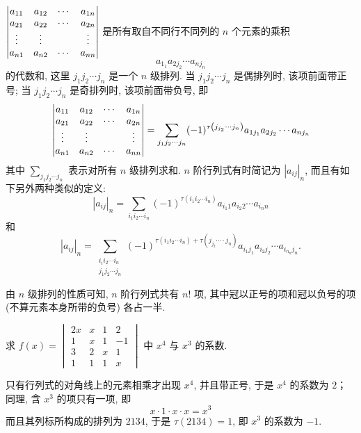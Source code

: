 \begin{definition}[$n$ 阶行列式]
    $\mqty|a_{11} & a_{12} & \cdots & a_{1 n} \\ a_{21} & a_{22} & \cdots & a_{2 n} \\ \vdots & \vdots & & \vdots \\ a_{n 1} & a_{n 2} & \cdots & a_{n n}|$
    是所有取自不同行不同列的 $ n $ 个元素的乘积 $$ a_{1_{1}} a_{2 j_{2}} \cdots a_{n j_{n}} $$ 的代数和, 这里 $ j_{1} j_{2} \cdots j_{n} $ 是一个 $ n $ 级排列.
    当 $ j_{1} j_{2} \cdots j_{n} $ 是偶排列时, 该项前面带正号; 当 $ j_{1} j_{2} \cdots j_{n} $ 是奇排列时, 该项前面带负号, 即
    $$\mqty|a_{11}  & a_{12}  & \cdots & a_{1 n} \\
            a_{21}  & a_{22}  & \cdots & a_{2 n} \\
            \vdots  & \vdots  &        & \vdots  \\
            a_{n 1} & a_{n 2} & \cdots & a_{n n}|=\sum_{j_{1} j_{2} \cdots j_{n}}(-1)^{\tau\left(j_{j_{2}} \cdots j_{n}\right)} a_{1 j_{1}} a_{2 j_{2}} \cdots a_{n j_{n}}$$
    其中 $ \displaystyle\sum_{j_{1} j_{2} \cdots j_{n}} $ 表示对所有 $ n $ 级排列求和. $ n $ 阶行列式有时简记为 $ \left|a_{i j}\right|_{n} $, 而且有如下另外两种类似的定义:
    $$\left|a_{i j}\right|_{n}=\sum_{i_{1} i_{2} \cdots i_{n}}(-1)^{\tau\left(i_{1} i_{2} \cdots i_{n}\right)} a_{i_{1} 1} a_{i_{2} 2} \cdots a_{i_{n} n}$$
    和 $$\left|a_{i j}\right|_{n}=\sum_{\substack{i_{i} i_{2} \cdots i_{n} \\  j_{1} j_{2} \cdots j_{n}}}(-1)^{\tau\left(i_{1} i_{2} \cdots i_{n}\right)+\tau\left(j_{j_{2}} \cdots \cdot j_{n}\right)} a_{i_{1} j_{1}} a_{i_{2} j_{2}} \cdots a_{i_{n_{n}} j_{n}} .$$
\end{definition}

由 $ n $ 级排列的性质可知, $n $ 阶行列式共有 $ n! $ 项, 其中冠以正号的项和冠以负号的项 (不算元素本身所带的负号) 各占一半.

\begin{example}
    求 $\displaystyle f(x)=\begin{vmatrix}
            2x & x & 1 & 2  \\
            1  & x & 1 & -1 \\
            3  & 2 & x & 1  \\
            1  & 1 & 1 & x
        \end{vmatrix}$ 中 $x^4$ 与 $x^3$ 的系数.
\end{example}
\begin{solution}
    只有行列式的对角线上的元素相乘才出现 $x^4$, 并且带正号, 于是 $x^4$ 的系数为 $2$；
    同理, 含 $x^3$ 的项只有一项, 即 $$x\cdot 1\cdot x\cdot x=x^3$$
    而且其列标所构成的排列为 $2134$, 于是 $\tau(2134)=1$, 即 $x^3$ 的系数为 $-1.$
\end{solution}

